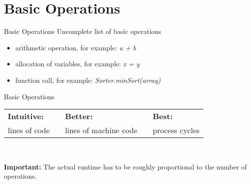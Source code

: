 \section{Basic Operations}

\begin{frame}{Basic Operations}
  Uncomplete list of basic operations
  \begin{center}
    \begin{itemize}
      \item
        arithmetic operation, for example: \textit{a + b}
      \item
        allocation of variables, for example: \textit{x = y}
      \item 
        function call, for example: \textit{Sorter.minSort(array)}
    \end{itemize}
  \end{center}
\end{frame}


\begin{frame}{Basic Operations}
  \begin{tabularx}{\textwidth}{@{}XcXcX@{}}
    \cellcolor{Mittel-Blau} {\color{white}\textbf{Intuitive:}} &
    {} &
    \cellcolor{Mittel-Blau} {\color{white}\textbf{Better:}} &
    {} &
    \cellcolor{Mittel-Blau} {\color{white}\textbf{Best:}}\\[0.5em]
    \rule{0pt}{1.25em}\cellcolor{Hell-Blau}lines of code &
    {} &
    \cellcolor{Hell-Blau}lines of machine code &
    {} &
    \cellcolor{Hell-Blau}process cycles
  \end{tabularx}\\[1.5em]
  \begin{alertblock}{\textbf{Important:}}
    The actual runtime has to be roughly proportional
    to the number of operations.
  \end{alertblock}
\end{frame}